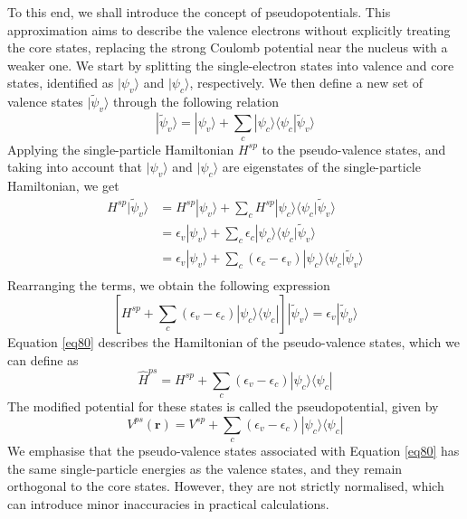 To this end, we shall introduce the concept of pseudopotentials\supercite{Hellmann1935}. This approximation aims to describe the valence electrons without explicitly treating the core states, replacing the strong Coulomb potential near the nucleus with a weaker one. We start by splitting the single-electron states into valence and core states, identified as $|\psi_{v}\rangle$ and $|\psi_{c}\rangle$, respectively. We then define a new set of valence states $|\tilde{\psi}_{v}\rangle$  through the following relation 
\begin{equation}
    \label{eq78}
    |\tilde{\psi}_{v}\rangle = |\psi_{v}\rangle + \sum_{c} |\psi_{c}\rangle 
    \langle \psi_{c} |\tilde{\psi}_{v}\rangle
\end{equation}
Applying the single-particle Hamiltonian $H^{sp}$ to the pseudo-valence states, and taking into account that $|\psi_{v}\rangle$ and $|\psi_{c}\rangle$ are eigenstates of the single-particle Hamiltonian, we get
\begin{equation}
    \label{eq79}
    \begin{aligned}
    H^{sp} |\tilde{\psi}_{v}\rangle &= H^{sp}|\psi_{v}\rangle  + 
    \sum_{c} H^{sp}|\psi_{c}\rangle \langle \psi_{c} |\tilde{\psi}_{v}\rangle\\
    &= \epsilon_{v} |\psi_{v}\rangle + \sum_{c} \epsilon_{c} |\psi_{c}\rangle
    \langle \psi_{c} |\tilde{\psi}_{v}\rangle\\
    &= \epsilon_{v} |\psi_{v}\rangle + \sum_{c} (\epsilon_{c} - \epsilon_{v}) |\psi_{c}\rangle
    \langle \psi_{c} |\tilde{\psi}_{v}\rangle\\
    \end{aligned}
\end{equation}
Rearranging the terms, we obtain the following expression
\begin{equation}
    \label{eq80}
    \left[H^{sp} + \sum_{c} (\epsilon_{v} - \epsilon_{c})|\psi_{c}\rangle \langle \psi_{c} | \right] 
    |\tilde{\psi}_{v}\rangle = \epsilon_{v} |\tilde{\psi}_{v}\rangle
\end{equation}
Equation \ref{eq80} describes the Hamiltonian of the pseudo-valence states, which we can define as 
\begin{equation}
    \label{eq81}
    \hat{H}^{ps} = H^{sp} + \sum_{c} (\epsilon_{v} - \epsilon_{c})|\psi_{c}\rangle \langle \psi_{c} |
\end{equation}
The modified potential for these states is called the pseudopotential, given by 
\begin{equation}
    \label{eq82}
    V^{ps}(\mathbf{r}) = V^{sp} + \sum_{c} (\epsilon_{v} - \epsilon_{c})|\psi_{c}\rangle \langle \psi_{c} |
\end{equation}
We emphasise that the pseudo-valence states associated with Equation \ref{eq80} has the same single-particle energies as the valence states, and they remain orthogonal to the core states. However, they are not strictly normalised, which can introduce minor inaccuracies in practical calculations. 

